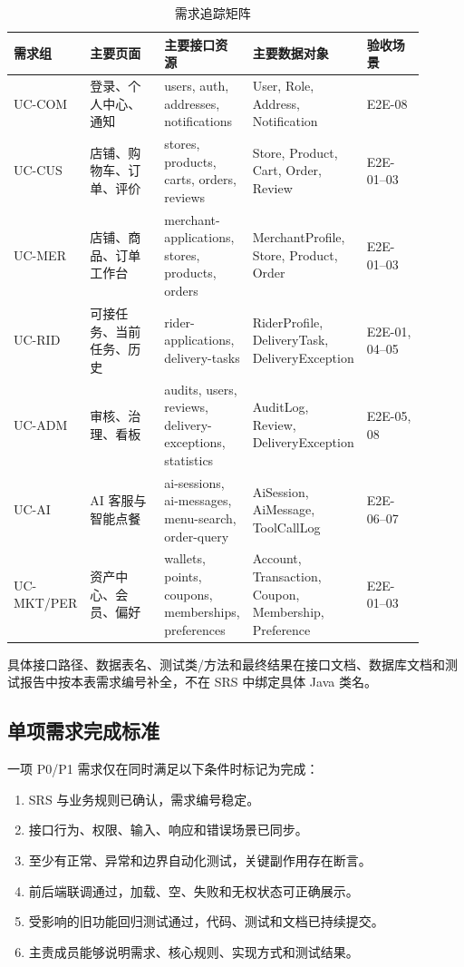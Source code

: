 \begin{longtable}{|L{0.17\linewidth}|L{0.20\linewidth}|L{0.18\linewidth}|L{0.20\linewidth}|L{0.15\linewidth}|}
\caption{需求追踪矩阵}\label{tab:traceability}\\ \hline
\textbf{需求组} & \textbf{主要页面} & \textbf{主要接口资源} & \textbf{主要数据对象} & \textbf{验收场景} \\ \hline
UC-COM & 登录、个人中心、通知 & users, auth, addresses, notifications & User, Role, Address, Notification & E2E-08 \\ \hline
UC-CUS & 店铺、购物车、订单、评价 & stores, products, carts, orders, reviews & Store, Product, Cart, Order, Review & E2E-01--03 \\ \hline
UC-MER & 店铺、商品、订单工作台 & merchant-applications, stores, products, orders & Merchant\-Profile, Store, Product, Order & E2E-01--03 \\ \hline
UC-RID & 可接任务、当前任务、历史 & rider-applications, delivery-tasks & Rider\-Profile, Delivery\-Task, Delivery\-Exception & E2E-01, 04--05 \\ \hline
UC-ADM & 审核、治理、看板 & audits, users, reviews, delivery-exceptions, statistics & AuditLog, Review, DeliveryException & E2E-05, 08 \\ \hline
UC-AI & AI 客服与智能点餐 & ai-sessions, ai-messages, menu-search, order-query & AiSession, AiMessage, ToolCallLog & E2E-06--07 \\ \hline
UC-MKT/PER & 资产中心、会员、偏好 & wallets, points, coupons, memberships, preferences & Account, Transaction, Coupon, Membership, Preference & E2E-01--03 \\ \hline
\end{longtable}

具体接口路径、数据表名、测试类/方法和最终结果在接口文档、数据库文档和测试报告中按本表需求编号补全，不在 SRS 中绑定具体 Java 类名。

\subsection{单项需求完成标准}

一项 P0/P1 需求仅在同时满足以下条件时标记为完成：

\begin{enumerate}
  \item SRS 与业务规则已确认，需求编号稳定。
  \item 接口行为、权限、输入、响应和错误场景已同步。
  \item 至少有正常、异常和边界自动化测试，关键副作用存在断言。
  \item 前后端联调通过，加载、空、失败和无权状态可正确展示。
  \item 受影响的旧功能回归测试通过，代码、测试和文档已持续提交。
  \item 主责成员能够说明需求、核心规则、实现方式和测试结果。
\end{enumerate}
